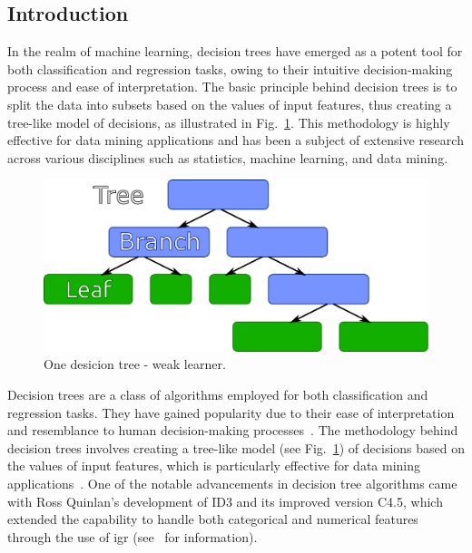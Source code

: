 \subsection{Introduction}

In the realm of machine learning, decision trees have emerged as a potent tool for both classification and regression tasks, owing to their intuitive decision-making process and ease of interpretation. The basic principle behind decision trees is to split the data into subsets based on the values of input features, thus creating a tree-like model of decisions, as illustrated in Fig.~\ref{fig:tree_scheme}. This methodology is highly effective for data mining applications and has been a subject of extensive research across various disciplines such as statistics, machine learning, and data mining.


\begin{figure}[htpb]
   \centering
    \includegraphics[width=0.5\linewidth]{images/boost/tree_scheme.pdf}
    \caption{One desicion tree - weak learner.}
    \label{fig:tree_scheme}
\end{figure}


Decision trees are a class of algorithms employed for both classification and regression tasks. They have gained popularity due to their ease of interpretation and resemblance to human decision-making processes~\cite{kotsiantis2013decision, song2015decision}. The methodology behind decision trees involves creating a tree-like model (see Fig.~\ref{fig:tree_scheme}) of decisions based on the values of input features, which is particularly effective for data mining applications~\cite{song2015decision}. 
One of the notable advancements in decision tree algorithms came with Ross Quinlan's development of ID3 and its improved version C4.5, which extended the capability to handle both categorical and numerical features through the use of 
\acrfull{igr} (see~\cite{mienye2019prediction} for information).

